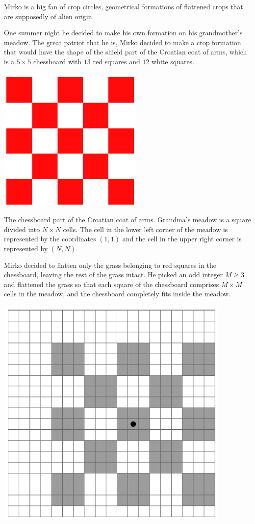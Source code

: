 Mirko is a big fan of crop circles, geometrical formations of flattened crops that are supposedly of alien origin.

One summer night he decided to make his own formation on his grandmother's meadow. The great patriot that he is, Mirko decided to make a crop formation that would have the shape of the shield part of the Croatian coat of arms, which is a $5 \times 5$ chessboard with $13$ red squares and $12$ white squares.

\includegraphics{aliens1.png}

The chessboard part of the Croatian coat of arms. Grandma's meadow is a square divided into $N \times N$ cells. The cell in the lower left corner of the meadow is
represented by the coordinates $(1, 1)$ and the cell in the upper right corner is represented by $(N, N)$.

Mirko decided to flatten only the grass belonging to red squares in the chessboard, leaving the rest of the grass
intact. He picked an odd integer $M \ge 3$ and flattened the grass so that each square of the chessboard comprises
$M \times M$ cells in the meadow, and the chessboard completely fits inside the meadow.

\includegraphics{aliens2.png}

